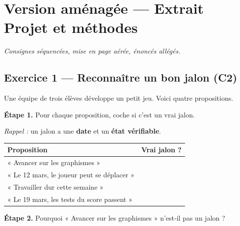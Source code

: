 \section*{Version aménagée --- Extrait Projet et méthodes}
\textit{Consignes séquencées, mise en page aérée, énoncés allégés.}

\bigskip

\subsection*{Exercice 1 --- Reconnaître un bon jalon (C2)}

Une équipe de trois élèves développe un petit jeu. Voici quatre propositions.

\bigskip

\textbf{Étape 1.} Pour chaque proposition, coche si c'est un vrai jalon.

\medskip
\textit{Rappel :} un jalon a une \textbf{date} et un \textbf{état vérifiable}.

\bigskip

\begin{center}
\begin{tabular}{|l|c|}
\hline
\textbf{Proposition} & \textbf{Vrai jalon ?} \\
\hline
« Avancer sur les graphismes » & \dotfill \\
\hline
« Le 12 mars, le joueur peut se déplacer » & \dotfill \\
\hline
« Travailler dur cette semaine » & \dotfill \\
\hline
« Le 19 mars, les tests du score passent » & \dotfill \\
\hline
\end{tabular}
\end{center}

\bigskip

\textbf{Étape 2.} Pourquoi « Avancer sur les graphismes » n'est-il pas un jalon ?

\medskip
\begin{center}
 \qquad {}
\end{center}

